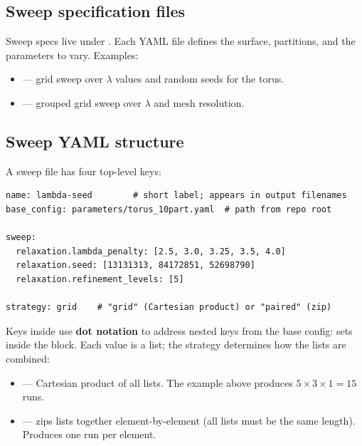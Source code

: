 \documentclass[11pt,a4paper]{article}
\begin{document}
\subsection{Sweep specification files}

Sweep specs live under .  Each YAML file defines
the surface, partitions, and the parameters to vary.  Examples:

\begin{itemize}[leftmargin=1.5em]
  \item {} --- grid sweep over
        $\lambda$ values and random seeds for the torus.
  \item {} --- grouped
        grid sweep over $\lambda$ and mesh resolution.
\end{itemize}

\subsection{Sweep YAML structure}
\label{sec:sweep-yaml}

A sweep file has four top-level keys:

\begin{lstlisting}[style=shell]
name: lambda-seed        # short label; appears in output filenames
base_config: parameters/torus_10part.yaml  # path from repo root

sweep:
  relaxation.lambda_penalty: [2.5, 3.0, 3.25, 3.5, 4.0]
  relaxation.seed: [13131313, 84172851, 52698790]
  relaxation.refinement_levels: [5]

strategy: grid    # "grid" (Cartesian product) or "paired" (zip)
\end{lstlisting}

Keys inside  use \textbf{dot notation} to address nested
keys from the base config:  sets
 inside the  block.
Each value is a list; the strategy determines how the lists are combined:

\begin{itemize}[leftmargin=1.5em]
  \item {} --- Cartesian product of all lists.
        The example above produces $5 \times 3 \times 1 = 15$ runs.
  \item {} --- zips lists together element-by-element
        (all lists must be the same length).  Produces one run per element.
\end{itemize}
\end{document}
